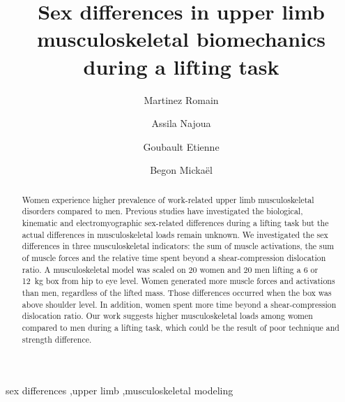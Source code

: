 \documentclass[preprint,review,12pt]{elsarticle}
\begin{document}

    \begin{frontmatter}

        \title{Sex differences in upper limb musculoskeletal biomechanics during a lifting task}


        \author[1]{Martinez Romain}
        \author[1]{Assila Najoua}
        \author[1]{Goubault Etienne}
        \author[1]{Begon Mickaël}

        \address[1]{School of Kinesiology and Exercise Science, Faculty of Medicine, University of Montreal}



        \begin{abstract}
            Women experience higher prevalence of work-related upper limb musculoskeletal disorders compared to men.
            Previous studies have investigated the biological, kinematic and electromyographic sex-related differences during a lifting task but the actual differences in musculoskeletal loads remain unknown.
            We investigated the sex differences in three musculoskeletal indicators: the sum of muscle activations, the sum of muscle forces and the relative time spent beyond a shear-compression dislocation ratio.
            A musculoskeletal model was scaled on 20 women and 20 men lifting a 6 or 12~kg box from hip to eye level.
            Women generated more muscle forces and activations than men, regardless of the lifted mass.
            Those differences occurred when the box was above shoulder level.
            In addition, women spent more time beyond a shear-compression dislocation ratio.
            Our work suggests higher musculoskeletal loads among women compared to men during a lifting task, which could be the result of poor technique and strength difference.
        \end{abstract}

        \begin{keyword}
            sex differences \sep upper limb \sep musculoskeletal modeling
        \end{keyword}

    \end{frontmatter}
\end{document}
